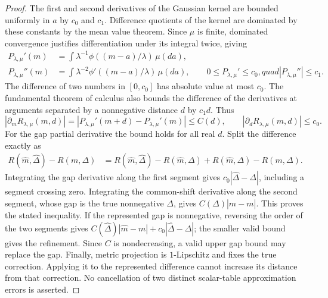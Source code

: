\begin{proof}
The first and second derivatives of the Gaussian kernel are bounded
uniformly in $a$ by $c_0$ and $c_1$. Difference quotients of the kernel
are dominated by these constants by the mean value theorem. Since
$\mu$ is finite, dominated convergence justifies differentiation under
its integral twice, giving
\begin{align}
 P_{\lambda,\mu}'(m)&=\int\lambda^{-1}
                 \phi((m-a)/\lambda)\,\mu(da),\nonumber\\
 P_{\lambda,\mu}''(m)&=\int\lambda^{-2}
                 \phi'((m-a)/\lambda)\,\mu(da),\qquad
 0\leq P_{\lambda,\mu}'\leq c_0,quad
 |P_{\lambda,\mu}''|\leq c_1.
 \label{eq:common-information-derivatives}
\end{align}
The difference of two numbers in $[0,c_0]$ has absolute value at most
$c_0$. The fundamental theorem of calculus also bounds the difference
of the derivatives at arguments separated by a nonnegative distance $d$
by $c_1d$. Thus
\begin{equation}
 |\partial_m R_{\lambda,\mu}(m,d)|
   =|P_{\lambda,\mu}'(m+d)-P_{\lambda,\mu}'(m)|\leq C(d),\qquad
 |\partial_dR_{\lambda,\mu}(m,d)|\leq c_0.
 \label{eq:common-information-partial-bounds}
\end{equation}
For the gap partial derivative the bound holds for all real $d$.
Split the difference exactly as
\begin{align}
 R(\widehat m,\widehat\Delta)-R(m,\Delta)
 &=R(\widehat m,\widehat\Delta)-R(\widehat m,\Delta)
       +R(\widehat m,\Delta)-R(m,\Delta).
 \label{eq:common-information-path}
\end{align}
Integrating the gap derivative along the first segment gives
$c_0|\widehat\Delta-\Delta|$, including a segment crossing zero.
Integrating the common-shift derivative along the second segment, whose
gap is the true nonnegative $\Delta$, gives
$C(\Delta)|\widehat m-m|$. This proves the stated inequality. If the
represented gap is nonnegative, reversing the order of the two segments
gives $C(\widehat\Delta)|\widehat m-m|+c_0|\widehat\Delta-\Delta|$;
the smaller valid bound gives the refinement. Since $C$ is nondecreasing,
a valid upper gap bound may replace the gap. Finally, metric projection
is $1$-Lipschitz and fixes the true correction. Applying it to the
represented difference cannot increase its distance from that correction.
No cancellation of two distinct scalar-table approximation errors is
asserted.
\end{proof}

